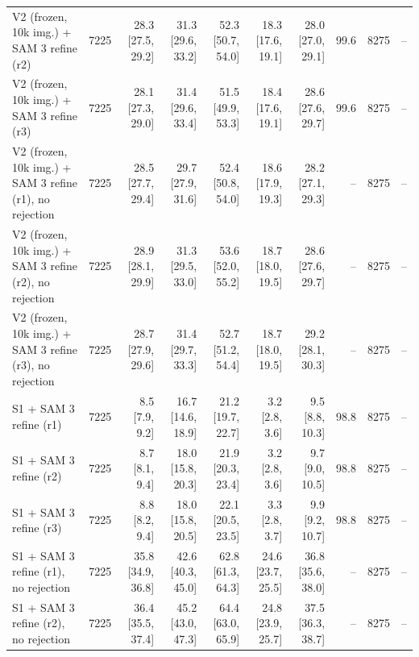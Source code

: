 \begin{tabular}{lrrrrrrrrr}
V2 (frozen, 10k img.) + SAM 3 refine (r2) & 7225 & 28.3 \scriptsize{[27.5, 29.2]} & 31.3 \scriptsize{[29.6, 33.2]} & 52.3 \scriptsize{[50.7, 54.0]} & 18.3 \scriptsize{[17.6, 19.1]} & 28.0 \scriptsize{[27.0, 29.1]} & 99.6 & 8275 & -- \\
V2 (frozen, 10k img.) + SAM 3 refine (r3) & 7225 & 28.1 \scriptsize{[27.3, 29.0]} & 31.4 \scriptsize{[29.6, 33.4]} & 51.5 \scriptsize{[49.9, 53.3]} & 18.4 \scriptsize{[17.6, 19.1]} & 28.6 \scriptsize{[27.6, 29.7]} & 99.6 & 8275 & -- \\
\midrule
V2 (frozen, 10k img.) + SAM 3 refine (r1), no rejection & 7225 & 28.5 \scriptsize{[27.7, 29.4]} & 29.7 \scriptsize{[27.9, 31.6]} & 52.4 \scriptsize{[50.8, 54.0]} & 18.6 \scriptsize{[17.9, 19.3]} & 28.2 \scriptsize{[27.1, 29.3]} & -- & 8275 & -- \\
V2 (frozen, 10k img.) + SAM 3 refine (r2), no rejection & 7225 & 28.9 \scriptsize{[28.1, 29.9]} & 31.3 \scriptsize{[29.5, 33.0]} & 53.6 \scriptsize{[52.0, 55.2]} & 18.7 \scriptsize{[18.0, 19.5]} & 28.6 \scriptsize{[27.6, 29.7]} & -- & 8275 & -- \\
V2 (frozen, 10k img.) + SAM 3 refine (r3), no rejection & 7225 & 28.7 \scriptsize{[27.9, 29.6]} & 31.4 \scriptsize{[29.7, 33.3]} & 52.7 \scriptsize{[51.2, 54.4]} & 18.7 \scriptsize{[18.0, 19.5]} & 29.2 \scriptsize{[28.1, 30.3]} & -- & 8275 & -- \\
\midrule
S1 + SAM 3 refine (r1) & 7225 & 8.5 \scriptsize{[7.9, 9.2]} & 16.7 \scriptsize{[14.6, 18.9]} & 21.2 \scriptsize{[19.7, 22.7]} & 3.2 \scriptsize{[2.8, 3.6]} & 9.5 \scriptsize{[8.8, 10.3]} & 98.8 & 8275 & -- \\
S1 + SAM 3 refine (r2) & 7225 & 8.7 \scriptsize{[8.1, 9.4]} & 18.0 \scriptsize{[15.8, 20.3]} & 21.9 \scriptsize{[20.3, 23.4]} & 3.2 \scriptsize{[2.8, 3.6]} & 9.7 \scriptsize{[9.0, 10.5]} & 98.8 & 8275 & -- \\
S1 + SAM 3 refine (r3) & 7225 & 8.8 \scriptsize{[8.2, 9.4]} & 18.0 \scriptsize{[15.8, 20.5]} & 22.1 \scriptsize{[20.5, 23.5]} & 3.3 \scriptsize{[2.8, 3.7]} & 9.9 \scriptsize{[9.2, 10.7]} & 98.8 & 8275 & -- \\
\midrule
S1 + SAM 3 refine (r1), no rejection & 7225 & 35.8 \scriptsize{[34.9, 36.8]} & 42.6 \scriptsize{[40.3, 45.0]} & 62.8 \scriptsize{[61.3, 64.3]} & 24.6 \scriptsize{[23.7, 25.5]} & 36.8 \scriptsize{[35.6, 38.0]} & -- & 8275 & -- \\
S1 + SAM 3 refine (r2), no rejection & 7225 & 36.4 \scriptsize{[35.5, 37.4]} & 45.2 \scriptsize{[43.0, 47.3]} & 64.4 \scriptsize{[63.0, 65.9]} & 24.8 \scriptsize{[23.9, 25.7]} & 37.5 \scriptsize{[36.3, 38.7]} & -- & 8275 & -- \\

\end{tabular}
